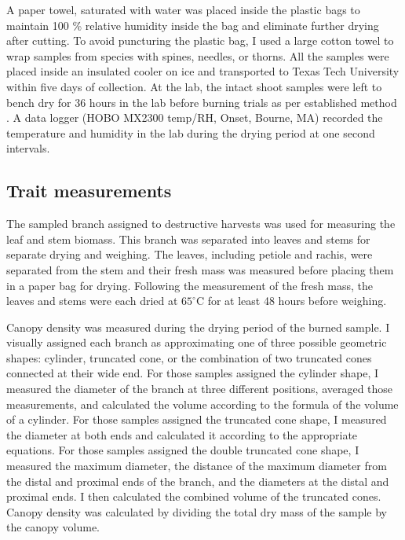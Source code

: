 \documentclass[12pt]{report}
\begin{document}
A paper towel, saturated with water was placed inside the plastic bags to maintain 100 \% relative humidity inside the bag and eliminate further drying after cutting. To avoid puncturing the plastic bag, I used a large cotton towel to wrap samples from species with spines, needles, or thorns. All the samples were placed inside an insulated cooler on ice and transported to Texas Tech University within five days of collection.  %
At the lab, the intact shoot samples were left to bench dry for 36 hours in the lab before burning trials  as per established method \citep{wyse2016quantitative}. %
A data logger (HOBO MX2300 temp/RH, Onset, Bourne, MA) recorded the temperature and humidity in the lab during the drying period at one second intervals.



\subsection{Trait measurements}
The sampled branch assigned to destructive harvests was used for measuring the leaf and stem biomass.
This branch was separated into leaves and stems for separate drying and weighing. The leaves, including petiole and rachis, were separated from the stem and their fresh mass was measured before placing them in a paper bag for drying. Following the measurement of the fresh mass, the leaves and stems were each dried at $65^{\circ}$C for at least 48 hours before weighing.

Canopy density was measured during the drying period of the burned sample. I visually assigned each branch as approximating one of three possible geometric shapes: cylinder, truncated cone, or the combination of two truncated cones connected at their wide end. For those samples assigned the cylinder shape, I measured the diameter of the branch at three different positions, averaged those measurements, and calculated the volume according to the formula of the volume of a cylinder. For those samples assigned the truncated cone shape, I measured the diameter at both ends and calculated it according to the appropriate equations. For those samples assigned the double truncated cone shape, I measured the maximum diameter, the distance of the maximum diameter from the distal and proximal ends of the branch, and the diameters at the distal and proximal ends. I then calculated the combined volume of the truncated cones. Canopy density was calculated by dividing the total dry mass of the sample by the canopy volume.
\end{document}

